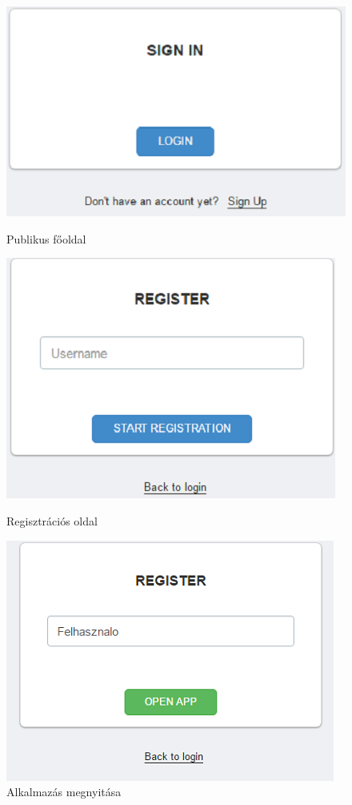 \begin{figure}[h]
 \begin{minipage}{.30\textwidth} 
\centering
    \includegraphics[scale=0.30]{img/sign_up_link}
    \caption{Publikus főoldal}
 \end{minipage}
 \begin{minipage}{.30\textwidth} 
\centering
     \includegraphics[scale=0.30]{img/register_page}
     \caption{Regisztrációs oldal}
 \end{minipage}
 \begin{minipage}{.30\textwidth} 
\centering
     \includegraphics[scale=0.30]{img/open_app_registration}
     \caption{Alkalmazás megnyitása}
 \end{minipage}
\end{figure}

